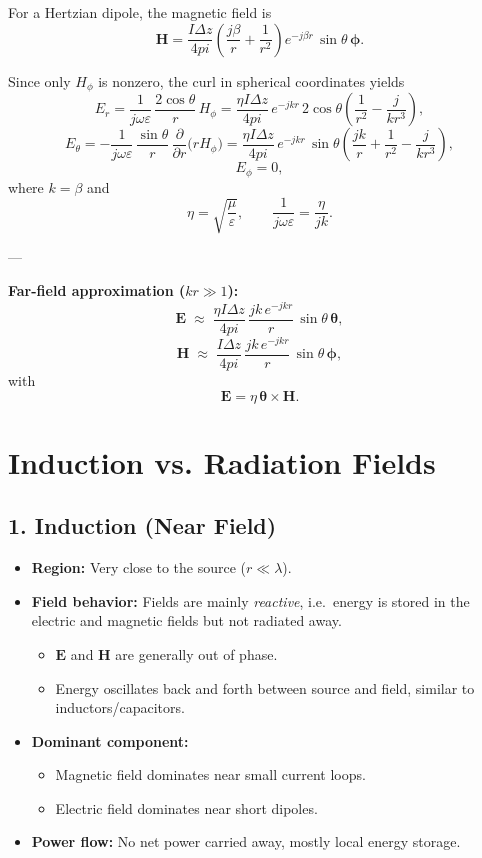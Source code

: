 \documentclass{article}
\def\pi{pi}%
\def\hat#1{#1}%
\begin{document}
For a Hertzian dipole, the magnetic field is
\[
\mathbf{H} = \frac{I \Delta z}{4\pi}
\left( \frac{j\beta}{r} + \frac{1}{r^{2}} \right)
e^{-j\beta r} \, \sin\theta \, \hat{\boldsymbol\phi}.
\]

Since only $H_\phi$ is nonzero, the curl in spherical coordinates yields
\[
E_r = \frac{1}{j\omega\varepsilon}\,\frac{2\cos\theta}{r}\,H_\phi
= \frac{\eta I\Delta z}{4\pi} \, e^{-jkr} \,
2\cos\theta \left( \frac{1}{r^{2}} - \frac{j}{kr^{3}} \right),
\]
\[
E_\theta = -\frac{1}{j\omega\varepsilon}\,
\frac{\sin\theta}{r} \,\frac{\partial}{\partial r}\big(rH_\phi\big)
= \frac{\eta I\Delta z}{4\pi} \, e^{-jkr} \,
\sin\theta \left( \frac{jk}{r} + \frac{1}{r^{2}} - \frac{j}{kr^{3}} \right),
\]
\[
E_\phi = 0,
\]
where $k=\beta$ and
\[
\eta = \sqrt{\frac{\mu}{\varepsilon}}, \qquad 
\frac{1}{j\omega\varepsilon} = \frac{\eta}{jk}.
\]

---

\textbf{Far-field approximation ($kr\gg1$):}
\[
\mathbf{E} \;\approx\; \frac{\eta I\Delta z}{4\pi}\,
\frac{jk\, e^{-jkr}}{r}\,\sin\theta\,\hat{\boldsymbol\theta},
\]
\[
\mathbf{H} \;\approx\; \frac{I\Delta z}{4\pi}\,
\frac{jk\, e^{-jkr}}{r}\,\sin\theta\,\hat{\boldsymbol\phi},
\]
with
\[
\mathbf{E} = \eta \, \hat{\boldsymbol\theta} \times \mathbf{H}.
\]
\section*{Induction vs. Radiation Fields}

\subsection*{1. Induction (Near Field)}
\begin{itemize}
  \item \textbf{Region:} Very close to the source ($r \ll \lambda$).
  \item \textbf{Field behavior:} Fields are mainly \emph{reactive}, i.e.\ energy is stored in the electric and magnetic fields but not radiated away. 
    \begin{itemize}
      \item $\mathbf{E}$ and $\mathbf{H}$ are generally out of phase.
      \item Energy oscillates back and forth between source and field, similar to inductors/capacitors.
    \end{itemize}
  \item \textbf{Dominant component:} 
    \begin{itemize}
      \item Magnetic field dominates near small current loops.
      \item Electric field dominates near short dipoles.
    \end{itemize}
  \item \textbf{Power flow:} No net power carried away, mostly local energy storage.
\end{itemize}
\end{document}

